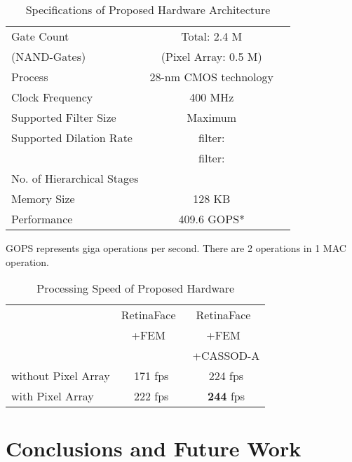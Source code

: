 \documentclass[10pt,twocolumn,letterpaper]{article}
\begin{document}
\begin{table}
\caption{Specifications of Proposed Hardware Architecture}
\begin{center}
\begin{tabular}{l|cc}
\hline
Gate Count                 & Total: 2.4 M \\
(NAND-Gates)               & (Pixel Array: 0.5 M)\\
\hline                     
Process                    & 28-nm CMOS technology\\
\hline                     
Clock Frequency            & 400 MHz\\
\hline                     
Supported Filter Size      & Maximum \\
Supported Dilation Rate    &  filter: \\
                           &  filter: \\
No. of Hierarchical Stages & \\
\hline
Memory Size                & 128 KB\\
\hline                     
Performance                & 409.6 GOPS*\\
\hline
\end{tabular}
\end{center}
{\footnotesize
GOPS represents giga operations per second. There are 2 operations in 1 MAC operation.
}
\label{tab:spec}
\end{table}


\begin{table}
\caption{Processing Speed of Proposed Hardware}
\begin{center}
\begin{tabular}{l|cc}
\hline
                    & RetinaFace~\cite{Deng19} & RetinaFace~\cite{Deng19} \\
                    & +FEM~\cite{Li18_1}       & +FEM~\cite{Li18_1} \\
                    &                          & +CASSOD-A \\
\hline                     
without Pixel Array & 171 fps & 224 fps\\
\hline
with Pixel Array    & 222 fps & \textbf{244} fps\\
\hline
\end{tabular}
\end{center}
\label{tab:speed}
\end{table}




\section{Conclusions and Future Work}
\label{sec:conclusion}
\end{document}
